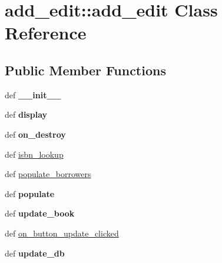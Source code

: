 \hypertarget{classadd__edit_1_1add__edit}{
\section{add\_\-edit::add\_\-edit Class Reference}
\label{classadd__edit_1_1add__edit}
}
\subsection*{Public Member Functions}
\begin{DoxyCompactItemize}
\item 
\hypertarget{classadd__edit_1_1add__edit_af4a994f883cc9f1d4ce4755151a018fd}{
def {\bfseries \_\-\_\-init\_\-\_\-}}
\label{classadd__edit_1_1add__edit_af4a994f883cc9f1d4ce4755151a018fd}

\item 
\hypertarget{classadd__edit_1_1add__edit_a472de34bd215c34a8f035ae27432c42f}{
def {\bfseries display}}
\label{classadd__edit_1_1add__edit_a472de34bd215c34a8f035ae27432c42f}

\item 
\hypertarget{classadd__edit_1_1add__edit_a4e3c02b02b3f70cec786d5eee518b4d2}{
def {\bfseries on\_\-destroy}}
\label{classadd__edit_1_1add__edit_a4e3c02b02b3f70cec786d5eee518b4d2}

\item 
def \hyperlink{classadd__edit_1_1add__edit_a36b4710ceb597d80d0195c02e96decea}{isbn\_\-lookup}
\item 
def \hyperlink{classadd__edit_1_1add__edit_add93cbdf25b5aaad4d36f0de5df8d0b3}{populate\_\-borrowers}
\item 
\hypertarget{classadd__edit_1_1add__edit_a14e2bc151bf934a573f37dcc538ce94d}{
def {\bfseries populate}}
\label{classadd__edit_1_1add__edit_a14e2bc151bf934a573f37dcc538ce94d}

\item 
\hypertarget{classadd__edit_1_1add__edit_a81984199dbe0f6982544447433e3339d}{
def {\bfseries update\_\-book}}
\label{classadd__edit_1_1add__edit_a81984199dbe0f6982544447433e3339d}

\item 
def \hyperlink{classadd__edit_1_1add__edit_af302d7391d5c263de730b65dc39f7dd8}{on\_\-button\_\-update\_\-clicked}
\item 
\hypertarget{classadd__edit_1_1add__edit_a553121851a6735abee974f216eaaa69b}{
def {\bfseries update\_\-db}}
\label{classadd__edit_1_1add__edit_a553121851a6735abee974f216eaaa69b}


\end{DoxyCompactItemize}

